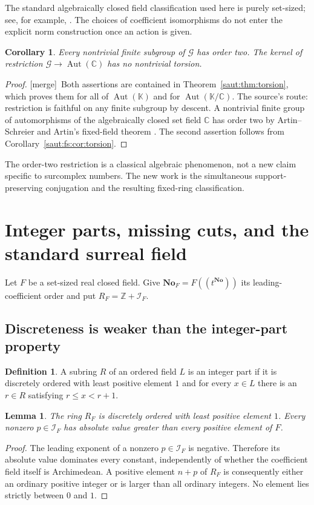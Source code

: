 \documentclass[11pt]{article}
\newtheorem{lemma}[theorem]{Lemma}
\newtheorem{corollary}[theorem]{Corollary}
\theoremstyle{definition}
\newtheorem{definition}[theorem]{Definition}
\theoremstyle{remark}
\newcommand{\No}{\mathbf{No}}
\newcommand{\C}{\mathbb C}
\newcommand{\Z}{\mathbb Z}
\newcommand{\K}{\mathbb K}
\newcommand{\Aut}{\operatorname{Aut}}
\newcommand{\Ineg}{\mathcal I}
\newcommand{\mergetag}{\textup{[merge]}}
\numberwithin{equation}{section}
\begin{document}
The standard algebraically closed field classification used here is purely
set-sized; see, for example, \cite{Lang}. The choices of coefficient isomorphisms do
not enter the explicit norm construction once an action is given.

\begin{corollary}\label{saut:fs:cor:finite-Gaussian}
Every nontrivial finite subgroup of $\mathcal G$ has order two. The kernel of
restriction $\mathcal G\to\Aut(\C)$ has no nontrivial torsion.
\end{corollary}
\begin{proof}
\mergetag\ Both assertions are contained in Theorem~\ref{saut:thm:torsion}, which
proves them for all of $\Aut(\K)$ and for $\Aut(\K/\C)$. The source's route: restriction is
faithful on any finite subgroup by descent. A nontrivial finite group of
automorphisms of the algebraically closed set field $\C$ has order two by
Artin--Schreier and Artin's fixed-field theorem \cite[Section~4]{Conrad}. The second
assertion follows from Corollary~\ref{saut:fs:cor:torsion}.
\end{proof}

The order-two restriction is a classical algebraic phenomenon, not a new claim
specific to surcomplex numbers. The new work is the simultaneous support-preserving
conjugation and the resulting fixed-ring classification.

\section{Integer parts, missing cuts, and the standard surreal field}\label{saut:fs:sec:integerparts}

Let $F$ be a set-sized real closed field. Give $\No_F=F((t^{\No}))$ its
leading-coefficient order and put $R_F=\Z+\Ineg_F$.

\subsection{Discreteness is weaker than the integer-part property}

\begin{definition}\label{saut:fs:def:integerpart}
A subring $R$ of an ordered field $L$ is an integer part if it is discretely ordered
with least positive element $1$ and for every $x\in L$ there is an $r\in R$
satisfying $r\le x<r+1$.
\end{definition}

\begin{lemma}\label{saut:fs:lem:discrete}
The ring $R_F$ is discretely ordered with least positive element $1$. Every nonzero
$p\in\Ineg_F$ has absolute value greater than every positive element of $F$.
\end{lemma}
\begin{proof}
The leading exponent of a nonzero $p\in\Ineg_F$ is negative. Therefore its absolute
value dominates every constant, independently of whether the coefficient field
itself is Archimedean. A positive element $n+p$ of $R_F$ is consequently either an
ordinary positive integer or is larger than all ordinary integers. No element lies
strictly between $0$ and $1$.
\end{proof}
\end{document}
